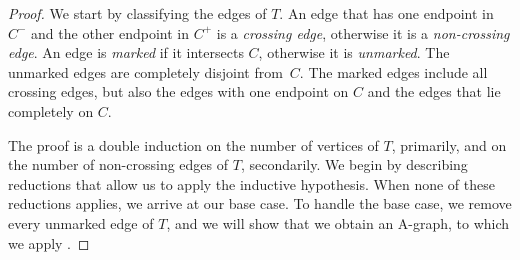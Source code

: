 
\begin{proof}
  We start by classifying the edges of $T$.  An edge that has one
  endpoint in $C^-$ and the other endpoint in $C^+$ is a \emph{crossing
    edge}, otherwise it is a \emph{non-crossing edge}.
%
  An edge
  is \emph{marked} if it intersects $C$, otherwise it is
  \emph{unmarked}.  The unmarked edges are completely disjoint
  from~$C$.  The marked edges include all crossing edges, but also the
  edges with one endpoint on $C$ and the edges that lie completely on
  $C$.
	
	
	
	The proof is a double induction on the number of vertices of $T$, primarily, and on the number of non-crossing edges of $T$, secondarily.
	We begin by describing reductions that allow us to apply the
	inductive hypothesis. When none of these reductions applies,
	we arrive at our base case. To handle the base case,
	we remove every unmarked edge of $T$, and we will show that we obtain an A-graph, to which we
	apply .


\end{proof}
